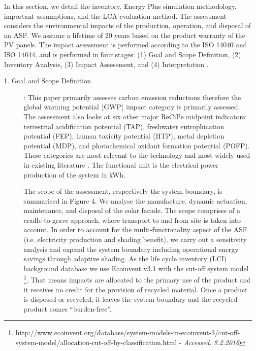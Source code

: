 
In this section, we detail the inventory, Energy Plus simulation methodology, important assumptions, and the LCA evaluation method. The assessment considers the environmental impacts of the production, operation, and disposal of an ASF. We assume a lifetime of 20 years based on the product warranty of the PV panels. The impact assessment is performed according to the ISO 14040 and ISO 14044, and is performed in four stages: (1) Goal and Scope Definition, (2) Inventory Analysis, (3) Impact Assessment, and (4) Interpretation \cite{finkbeiner2006new}.\\






\begin{description}

\item[1. Goal and Scope Definition]: This paper primarily assesses carbon emission reductions therefore the global warming potential (GWP) impact category is primarily assessed. The assessment also looks at six other major ReCiPe midpoint indicators: terrestrial acidification potential (TAP), freshwater eutrophication potential (FEP), human toxicity potential (HTP), metal depletion potential (MDP), and photochemical oxidant formation potential (POFP). These categories are most relevant to the technology and most widely used in existing literature \cite{ortiz2009sustainability}. The functional unit is the electrical power production of the system in kWh.

The scope of the assessment, respectively the system boundary, is summarised in Figure 4. We analyse the manufacture, dynamic actuation, maintenance, and disposal of the solar facade. The scope comprises of a cradle-to-grave approach, where transport to and from site is taken into account. 
In order to account for the multi-functionality aspect of the ASF (i.e. electricity production and shading benefit), we carry out a sensitivity analysis and expand the system boundary including operational energy savings through adaptive shading. As the life cycle inventory (LCI) background database we use Ecoinvent v3.1 \cite{frischknecht2005ecoinvent} with the cut-off system model \footnote{http://www.ecoinvent.org/database/system-models-in-ecoinvent-3/cut-off-system-model/allocation-cut-off-by-classification.html   -  \textit{Accessed: 8.2.2016}}. That means impacts are allocated to the primary use of the product and it receives no credit for the provision of recycled material. Once a product is disposed or recycled, it leaves the system boundary and the recycled product comes “burden-free”.


\end{description}
